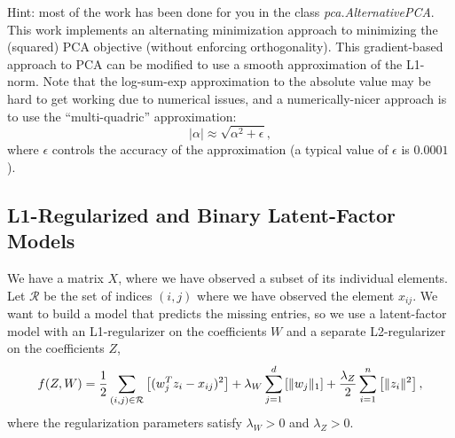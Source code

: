 \documentclass{article}
\begin{document}
Hint: most of the work has been done for you in the class \emph{pca.AlternativePCA}. This work implements an alternating minimization approach to minimizing the (squared) PCA objective (without enforcing orthogonality). This gradient-based approach to PCA can be modified to use a smooth approximation of the L1-norm. Note that the log-sum-exp approximation to the absolute value may be hard to get working due to numerical issues, and a numerically-nicer approach is to use the ``multi-quadric'' approximation:
\[
|\alpha| \approx \sqrt{\alpha^2 + \epsilon},
\]
where $\epsilon$ controls the accuracy of the approximation (a typical value of $\epsilon$ is $0.0001$).

\subsection{L1-Regularized and Binary Latent-Factor Models}

We have a matrix $X$, where we have observed a subset of its individual elements. Let $\mathcal{R}$ be the set of indices $(i,j)$ where we have observed the element $x_{ij}$. We want to build a model that predicts the missing entries, so we use a latent-factor model with an L1-regularizer on the coefficients $W$ and a separate L2-regularizer on the coefficients $Z$,
\[
f(Z,W) = \frac{1}{2}\sum_{(i,j) \in \mathcal{R}}\left[(w_j^Tz_i - x_{ij})^2 \right] + \lambda_W \sum_{j=1}^d \left[\|w_j\|_1\right] + \frac{\lambda_Z}{2} \sum_{i=1}^n \left[\|z_i\|^2\right],
\]
where the regularization parameters satisfy $\lambda_W > 0$ and $\lambda_Z > 0$.

\end{document}
